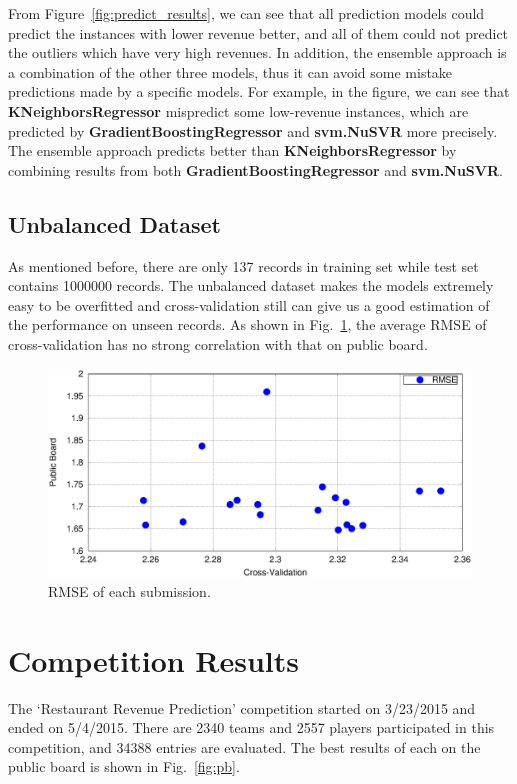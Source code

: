 \documentclass[10pt, oneside]{article}   	%
\newcommand\figref{Fig.~\ref}
\begin{document}
From Figure~\ref{fig:predict_results}, we can see that all prediction models could predict the instances with lower revenue better, and all of them could not predict the outliers which have very high revenues. In addition, the ensemble approach is a combination of the other three models, thus it can avoid some mistake predictions made by a specific models. For example, in the figure, we can see that \textbf{KNeighborsRegressor} mispredict some low-revenue instances, which are predicted by \textbf{GradientBoostingRegressor} and \textbf{svm.NuSVR} more precisely. The ensemble approach predicts better than  \textbf{KNeighborsRegressor} by combining results from both \textbf{GradientBoostingRegressor} and \textbf{svm.NuSVR}.

 
\subsection{Unbalanced Dataset}
As mentioned before, there are only 137 records in training set while test set contains 1000000 records.
The unbalanced dataset makes the models extremely easy to be overfitted and cross-validation still can give us a good estimation of the performance on unseen records.
As shown in \figref{fig:cv_lb_error}, the average RMSE of cross-validation has no strong correlation with that on public board.

\begin{figure}[h]
   \centering
   \includegraphics[width=5in]{figs/cv_pb_scores.eps} 
   \caption{RMSE of each submission.}
   \label{fig:cv_lb_error}
\end{figure}

\section{Competition Results}
The `Restaurant Revenue Prediction' competition started on 3/23/2015 and ended on 5/4/2015.
There are 2340 teams and 2557 players participated in this competition, and 34388 entries are evaluated.
The best results of each on the public board is shown in \figref{fig:pb}.
\end{document}

